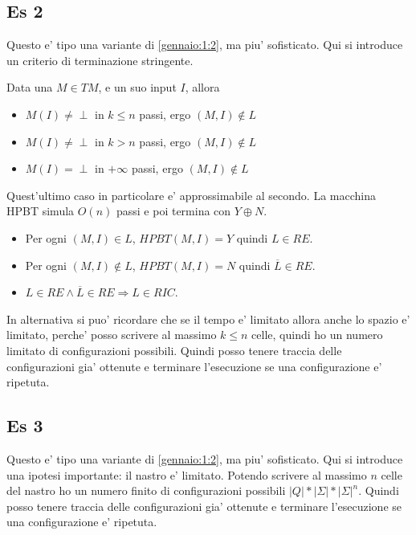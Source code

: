 \documentclass[a4paper,10pt,oneside]{book}
\begin{document}
\subsection{Es 2}

Questo e' tipo una variante di \ref{gennaio:1:2}, ma piu' sofisticato. Qui si introduce un criterio di terminazione stringente.

Data una $M \in TM$, e un suo input $I$, allora

\begin{itemize}
    \item $M(I) \not = \perp$ in $k \leq n$ passi, ergo $(M,I) \not \in L$
    \item $M(I) \not = \perp$ in $k > n$ passi, ergo $(M,I) \not \in L$
    \item $M(I) = \perp$ in $+\infty$ passi, ergo $(M,I) \not \in L$
\end{itemize}

Quest'ultimo caso in particolare e' approssimabile al secondo. La macchina HPBT simula $O(n)$ passi e poi termina con $Y \oplus N$.

\begin{itemize}
    \item Per ogni $(M,I) \in L$, $HPBT(M, I) = Y$ quindi $L \in RE$.
    \item Per ogni $(M,I) \not \in L$, $HPBT(M, I) = N$ quindi $\overline L \in RE$.
    \item $L \in RE \land \overline L \in RE \Rightarrow L \in RIC$.
\end{itemize}

In alternativa si puo' ricordare che se il tempo e' limitato allora anche lo spazio e' limitato, perche' posso scrivere al massimo $k \leq n$ celle, quindi ho un numero limitato di configurazioni possibili. Quindi posso tenere traccia delle configurazioni gia' ottenute e terminare l'esecuzione se una configurazione e' ripetuta.

\subsection{Es 3}

Questo e' tipo una variante di \ref{gennaio:1:2}, ma piu' sofisticato. Qui si introduce una ipotesi importante: il nastro e' limitato. Potendo scrivere al massimo $n$ celle del nastro ho un numero finito di configurazioni possibili $|Q| * |\Sigma| * {|\Sigma|}^{n}$. Quindi posso tenere traccia delle configurazioni gia' ottenute e terminare l'esecuzione se una configurazione e' ripetuta.
\end{document}

